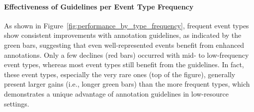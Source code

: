 \paragraph{Effectiveness of Guidelines per Event Type Frequency}
As shown in Figure~\ref{fig:performance_by_type_frequency}, frequent event types show consistent improvements with annotation guidelines, as indicated by the green bars, suggesting that even well-represented events benefit from enhanced annotations. Only a few declines (red bars) occurred with mid- to low-frequency event types, whereas most event types still benefit from the guidelines. In fact, these event types, especially the very rare ones (top of the figure), generally present larger gains (i.e., longer green bars) than the more frequent types, which demonstrates a unique advantage of annotation guidelines in low-resource settings.





